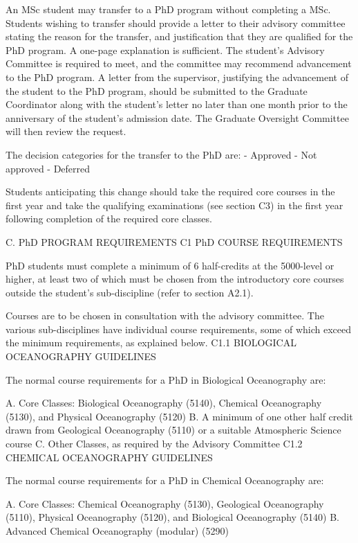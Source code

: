 An MSc student may transfer to a PhD program without completing a MSc. Students wishing to transfer should provide a letter to their advisory committee stating the reason for the transfer, and justification that they are qualified for the PhD program. A one-page explanation is sufficient. The student’s Advisory Committee is required to meet, and the committee may recommend advancement to the PhD program. A letter from the supervisor, justifying the advancement of the student to the PhD program, should be submitted to the Graduate Coordinator along with the student’s letter no later than one month prior to the anniversary of the student’s admission date. The Graduate Oversight Committee will then review the request.

The decision categories for the transfer to the PhD are:
-	Approved
-	Not approved
-	Deferred

Students anticipating this change should take the required core courses in the first year and take the qualifying examinations (see section C3) in the first year following completion of the required core classes.

C.	PhD  PROGRAM REQUIREMENTS
C1	PhD COURSE REQUIREMENTS

PhD students must complete a minimum of 6 half-credits at the 5000-level or higher, at least two of which must be chosen from the introductory core courses outside the student’s sub-discipline (refer to section A2.1).

Courses are to be chosen in consultation with the advisory committee. The various sub-disciplines have individual course requirements, some of which exceed the minimum requirements, as explained below.
C1.1	BIOLOGICAL OCEANOGRAPHY GUIDELINES

The normal course requirements for a PhD in Biological Oceanography are:

A.	Core Classes: Biological Oceanography (5140), Chemical Oceanography (5130), and Physical Oceanography (5120)
B.	A minimum of one other half credit drawn from Geological Oceanography (5110) or a suitable Atmospheric Science course
C.	Other Classes, as required by the Advisory Committee
C1.2	CHEMICAL OCEANOGRAPHY GUIDELINES

The normal course requirements for a PhD in Chemical Oceanography are:

A.	Core Classes: Chemical Oceanography (5130), Geological Oceanography (5110), Physical Oceanography (5120), and Biological Oceanography (5140)
B.	Advanced Chemical Oceanography (modular) (5290)
 

